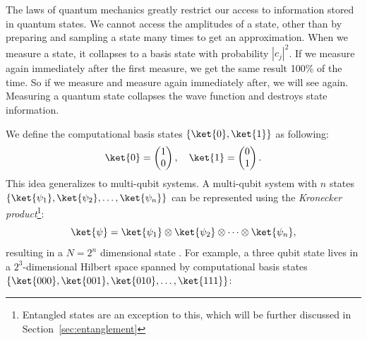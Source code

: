 \documentclass[a4paper,10pt]{article}
\newcommand{\qstatezero}{
	\begin{pmatrix}1 \\ 0\end{pmatrix}
}
\newcommand{\qstateone}{
	\begin{pmatrix}0 \\ 1\end{pmatrix}
}
\begin{document}
The laws of quantum mechanics greatly restrict our access to information stored in quantum states.
We cannot access the amplitudes of a state, other than by preparing and sampling a state many times to get an approximation. 
When we measure a state, it collapses to a basis state  with probability $|c_j|^2$.
If we measure again immediately after the first measure, we get the same result 100\% of the time.
So if we measure  and measure again immediately after, we will see  again.
Measuring a quantum state collapses the wave function and destroys state information.

We define the computational basis states $\{\ket{0}, \ket{1}\}$ as following:
\begin{equation}
\ket{0} = \qstatezero{}, \quad
\ket{1} = \qstateone{}.
\end{equation}
This idea generalizes to multi-qubit systems.
A multi-qubit system with $n$ states $\{\ket{\psi_1}, \ket{\psi_2}, \ldots, \ket{\psi_n}\}$ can be represented using the \emph{Kronecker product}\footnote{Entangled states are an exception to this, which will be further discussed in Section~\ref{sec:entanglement}}:
\begin{equation}
\ket{\psi} = \ket{\psi_1} \otimes \ket{\psi_2} \otimes \dotsm \otimes \ket{\psi_n},
\end{equation}
resulting in a $N = 2^n$ dimensional state \ket{\psi}.
For example, a three qubit state lives in a  $2^3$-dimensional Hilbert space spanned by computational basis states $\{\ket{000}, \ket{001}, \ket{010}, \ldots, \ket{111}\}$:
\end{document}

